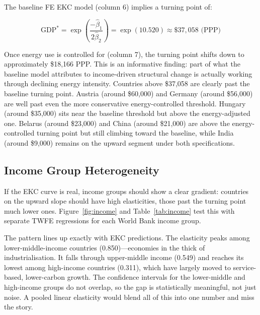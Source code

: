 \documentclass[12pt, a4paper]{article}
\begin{document}
The baseline FE EKC model (column 6) implies a turning point of:
 
\begin{equation}
    \text{GDP}^* = \exp\!\left(\frac{-\hat{\beta}_1}{2\hat{\beta}_2}\right) = \exp(10.520) \approx \$37{,}058 \text{ (PPP)}
    \label{eq:tp}
\end{equation}
 
Once energy use is controlled for (column 7), the turning point shifts down to approximately \$18,166 PPP. This is an informative finding: part of what the baseline model attributes to income-driven structural change is actually working through declining energy intensity. Countries above \$37,058 are clearly past the baseline turning point. Austria (around \$60,000) and Germany (around \$56,000) are well past even the more conservative energy-controlled threshold. Hungary (around \$35,000) sits near the baseline threshold but above the energy-adjusted one. Belarus (around \$23,000) and China (around \$21,000) are above the energy-controlled turning point but still climbing toward the baseline, while India (around \$9,000) remains on the upward segment under both specifications.
 
\subsection{Income Group Heterogeneity}
 
If the EKC curve is real, income groups should show a clear gradient: countries on the upward slope should have high elasticities, those past the turning point much lower ones. Figure~\ref{fig:income} and Table~\ref{tab:income} test this with separate TWFE regressions for each World Bank income group.
 
The pattern lines up exactly with EKC predictions. The elasticity peaks among lower-middle-income countries (0.850)---economies in the thick of industrialisation. It falls through upper-middle income (0.549) and reaches its lowest among high-income countries (0.311), which have largely moved to service-based, lower-carbon growth. The confidence intervals for the lower-middle and high-income groups do not overlap, so the gap is statistically meaningful, not just noise. A pooled linear elasticity would blend all of this into one number and miss the story.
 
\end{document}
